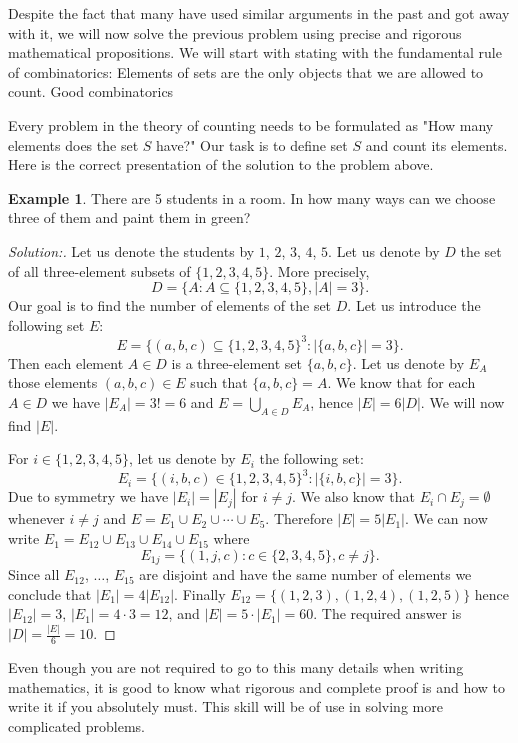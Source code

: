 \documentclass[11pt]{article}
\theoremstyle{definition}
\newtheorem{exmp}[thm]{Example}
\theoremstyle{plain}
\begin{document}
Despite the fact that many have used similar arguments in the past and got away with it, we will now solve the previous problem using precise and rigorous mathematical propositions. We will start with stating with the fundamental rule of combinatorics:
Elements of sets are the only objects that we are allowed to count.
Good combinatorics

Every problem in the theory of counting needs to be formulated as "How many elements does the set \( S \) have?" Our task is to define set \( S \) and count its elements. Here is the correct presentation of the solution to the problem above.

\begin{exmp}
There are 5 students in a room. In how many ways can we choose three of them and paint them in green?
\end{exmp}

\begin{proof}[Solution:] 
Let us denote the students by \( 1 \), \( 2 \), \( 3 \), \( 4 \), \( 5 \). Let us denote by \( D \) the set of all three-element subsets of \( \{1,2,3,4,5\} \). More precisely, \[ D=\{A: A\subseteq \{1,2,3,4,5\}, |A|=3\}.\] Our goal is to find the number of elements of the set \( D \). Let us introduce the following set \( E \): \[ E=\{(a,b,c)\subseteq \{1,2,3,4,5\}^3: |\{a,b,c\}|=3\}.\] Then each element \( A\in D \) is a three-element set \( \{a,b,c\} \). Let us denote by \( E_A \) those elements \( (a,b,c)\in E \) such that \( \{a,b,c\}=A \). We know that for each \( A\in D \) we have \( |E_A|=3!=6 \) and \( E=\bigcup_{A\in D}E_A \), hence \( |E|=6|D| \). We will now find \( |E| \).

For \( i\in\{1,2,3,4,5\} \), let us denote by \( E_{i} \) the following set: \[ E_i=\{(i,b,c)\in\{1,2,3,4,5\}^3: |\{i,b,c\}|=3\}.\] Due to symmetry we have \( |E_i|=|E_j| \) for \( i\neq j \). We also know that \( E_i\cap E_j=\emptyset \) whenever \( i\neq j \) and \( E=E_1\cup E_2\cup\cdots\cup E_5 \). Therefore \( |E|=5|E_1| \). We can now write \( E_1=E_{12}\cup E_{13}\cup E_{14}\cup E_{15} \) where \[ E_{1j}=\{(1,j,c):c\in\{2,3,4,5\}, c\neq j\}.\] Since all \( E_{12} \), \( \dots \), \( E_{15} \) are disjoint and have the same number of elements we conclude that \( |E_1|=4|E_{12}| \). Finally \( E_{12}=\{(1,2,3), (1,2,4), (1,2,5)\} \) hence \( |E_{12}|=3 \), \( |E_1|=4\cdot 3=12 \), and \( |E|=5\cdot |E_1|=60 \). The required answer is \( |D|=\frac{|E|}{6}=10 \).
\end{proof}

Even though you are not required to go to this many details when writing mathematics, it is good to know what rigorous and complete proof is and how to write it if you absolutely must. This skill will be of use in solving more complicated problems.
\end{document}
